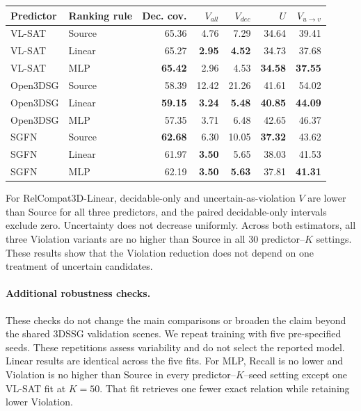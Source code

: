 \begin{center}
\centering
{\small
\setlength{\tabcolsep}{2pt}
\begin{tabular}{llrrrrr}
\toprule
Predictor & Ranking rule & Dec. cov. & $V_{all}$ & $V_{dec}$ & $U$ & $V_{u\to v}$ \\
\midrule
VL-SAT & Source & 65.36 & 4.76 & 7.29 & 34.64 & 39.41 \\
VL-SAT & Linear & 65.27 & \textbf{2.95} & \textbf{4.52} & 34.73 & 37.68 \\
VL-SAT & MLP & \textbf{65.42} & 2.96 & 4.53 & \textbf{34.58} & \textbf{37.55} \\
\midrule
Open3DSG & Source & 58.39 & 12.42 & 21.26 & 41.61 & 54.02 \\
Open3DSG & Linear & \textbf{59.15} & \textbf{3.24} & \textbf{5.48} & \textbf{40.85} & \textbf{44.09} \\
Open3DSG & MLP & 57.35 & 3.71 & 6.48 & 42.65 & 46.37 \\
\midrule
SGFN & Source & \textbf{62.68} & 6.30 & 10.05 & \textbf{37.32} & 43.62 \\
SGFN & Linear & 61.97 & \textbf{3.50} & 5.65 & 38.03 & 41.53 \\
SGFN & MLP & 62.19 & \textbf{3.50} & \textbf{5.63} & 37.81 & \textbf{41.31} \\
\bottomrule
\end{tabular}
}
\label{tab:uncertainty-sensitivity}
\end{center}

For RelCompat3D-Linear, decidable-only and uncertain-as-violation $V$ are lower than Source for all three predictors, and the paired decidable-only intervals exclude zero. Uncertainty does not decrease uniformly. Across both estimators, all three Violation variants are no higher than Source in all 30 predictor--$K$ settings. These results show that the Violation reduction does not depend on one treatment of uncertain candidates.

\paragraph{Additional robustness checks.}
These checks do not change the main comparisons or broaden the claim beyond the shared 3DSSG validation scenes. We repeat training with five pre-specified seeds. These repetitions assess variability and do not select the reported model. Linear results are identical across the five fits. For MLP, Recall is no lower and Violation is no higher than Source in every predictor--$K$--seed setting except one VL-SAT fit at $K=50$. That fit retrieves one fewer exact relation while retaining lower Violation.

